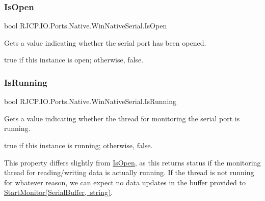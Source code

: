 \subsubsection{\texorpdfstring{IsOpen}{IsOpen}}
{\footnotesize\ttfamily bool R\+J\+C\+P.\+I\+O.\+Ports.\+Native.\+Win\+Native\+Serial.\+Is\+Open\hspace{0.3cm}{\ttfamily [get]}}



Gets a value indicating whether the serial port has been opened. 

{\ttfamily true} if this instance is open; otherwise, {\ttfamily false}. \mbox{\label{class_r_j_c_p_1_1_i_o_1_1_ports_1_1_native_1_1_win_native_serial_a1a0acd17c0516b73d5b1437631f71aa5}} 
\subsubsection{\texorpdfstring{IsRunning}{IsRunning}}
{\footnotesize\ttfamily bool R\+J\+C\+P.\+I\+O.\+Ports.\+Native.\+Win\+Native\+Serial.\+Is\+Running\hspace{0.3cm}{\ttfamily [get]}}



Gets a value indicating whether the thread for monitoring the serial port is running. 

{\ttfamily true} if this instance is running; otherwise, {\ttfamily false}. 

This property differs slightly from \mbox{\hyperlink{class_r_j_c_p_1_1_i_o_1_1_ports_1_1_native_1_1_win_native_serial_a4dfb0aaa0ac8a6591d682133bff22a37}{Is\+Open}}, as this returns status if the monitoring thread for reading/writing data is actually running. If the thread is not running for whatever reason, we can expect no data updates in the buffer provided to \mbox{\hyperlink{class_r_j_c_p_1_1_i_o_1_1_ports_1_1_native_1_1_win_native_serial_af8513c10fdf373932ec07a2bb033d0c4}{Start\+Monitor(\+Serial\+Buffer, string)}}. \mbox{\label{class_r_j_c_p_1_1_i_o_1_1_ports_1_1_native_1_1_win_native_serial_a0dab99500103a53dde02bd034cba7b11}} 
